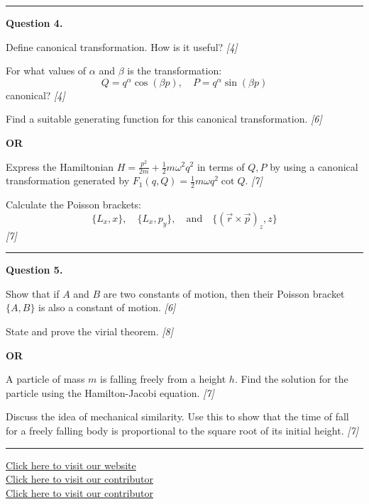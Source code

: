 \documentclass[11pt,a4paper]{article}
\newcommand{\pts}[1]{\hfill   \textit{[#1]}}
\begin{document}
\medskip\rule{\linewidth}{0.2pt}




\noindent   \textbf{Question 4.}

\begin{parts}
  \item Define canonical transformation. How is it useful? \pts{4}
  \item For what values of $\alpha$ and $\beta$ is the transformation:
    \[ Q = q^{\alpha} \cos(\beta p), \quad P = q^{\alpha} \sin(\beta p) \]
    canonical? \pts{4}
  \item Find a suitable generating function for this canonical transformation. \pts{6}
\end{parts}
\hfill   \textbf{OR}

\begin{parts}
  \item Express the Hamiltonian $H = \frac{p^2}{2m} + \frac{1}{2}m\omega^2 q^2$ in terms of $Q, P$ by using a canonical transformation generated by $F_1(q, Q) = \frac{1}{2} m\omega q^2 \cot Q$. \pts{7}
  \item Calculate the Poisson brackets:
    \[ \{L_x, x\}, \quad \{L_x, p_y\}, \quad  \text{and} \quad \{(\vec{r}  \times \vec{p})_z, z\} \] \pts{7}
\end{parts}

\medskip\rule{\linewidth}{0.2pt}




\noindent   \textbf{Question 5.}

\begin{parts}
  \item Show that if $A$ and $B$ are two constants of motion, then their Poisson bracket $\{A, B\}$ is also a constant of motion. \pts{6}
  \item State and prove the virial theorem. \pts{8}
\end{parts}
\hfill   \textbf{OR}

\begin{parts}
  \item A particle of mass $m$ is falling freely from a height $h$. Find the solution for the particle using the Hamilton-Jacobi equation. \pts{7}
  \item Discuss the idea of mechanical similarity. Use this to show that the time of fall for a freely falling body is proportional to the square root of its initial height. \pts{7}
\end{parts}

\vfill
\rule{\linewidth}{0.4pt}

\begin{center}\small
  \href{https://bhu-exam.vercel.app/}{Click here to visit our website}\\[4pt]
  \href{https://me-aryan.vercel.app/}{Click here to visit our contributor}\\[4pt]
  \href{https://quashan-me.vercel.app/}{Click here to visit our contributor}
\end{center}
\end{document}
